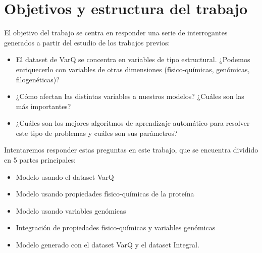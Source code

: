 

\section{Objetivos y estructura del trabajo}

El objetivo del trabajo se centra en responder una serie de interrogantes generados a partir del estudio de los trabajos previos:

\begin{itemize}
    \item El dataset de VarQ se concentra en variables de tipo estructural. ¿Podemos enriquecerlo con variables de otras dimensiones (físico-químicas, genómicas, filogenéticas)?
    \item ¿Cómo afectan las distintas variables a nuestros modelos? ¿Cuáles son las más importantes?
    \item ¿Cuáles son los mejores algoritmos de aprendizaje automático para resolver este tipo de problemas y cuáles son sus parámetros?
    
\end{itemize}

Intentaremos responder estas preguntas en este trabajo, que se encuentra dividido en 5 partes principales:

\begin{itemize}
    \item Modelo usando el dataset VarQ
    \item Modelo usando propiedades físico-químicas de la proteína
    \item Modelo usando variables genómicas
    \item Integración de propiedades fisico-químicas y variables genómicas
    \item Modelo generado con el dataset VarQ y el dataset Integral.
\end{itemize}


